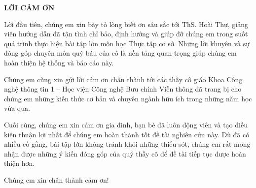 \documentclass[../BTL.tex]{subfiles}
\begin{document}
\begin{center}
    \Large{\textbf{LỜI CẢM ƠN}}\\
\end{center}
\vspace{1cm}

Lời đầu tiên, chúng em xin bày tỏ lòng biết ơn sâu sắc tới ThS. Hoài Thư, giảng viên hướng dẫn đã tận tình chỉ bảo, định hướng và giúp đỡ chúng em trong suốt quá trình thực hiện bài tập lớn môn học Thực tập cơ sở. Những lời khuyên và sự đóng góp chuyên môn quý báu của cô là nền tảng quan trọng giúp chúng em hoàn thiện hệ thống và báo cáo này.

Chúng em cũng xin gửi lời cảm ơn chân thành tới các thầy cô giáo Khoa Công nghệ thông tin 1 – Học viện Công nghệ Bưu chính Viễn thông đã trang bị cho chúng em những kiến thức cơ bản và chuyên ngành hữu ích trong những năm học vừa qua.

Cuối cùng, chúng em xin cảm ơn gia đình, bạn bè đã luôn động viên và tạo điều kiện thuận lợi nhất để chúng em hoàn thành tốt đề tài nghiên cứu này. Dù đã có nhiều cố gắng, bài tập lớn không tránh khỏi những thiếu sót, chúng em rất mong nhận được những ý kiến đóng góp của quý thầy cô để đề tài tiếp tục được hoàn thiện hơn.

Chúng em xin chân thành cảm ơn!
\end{document}
